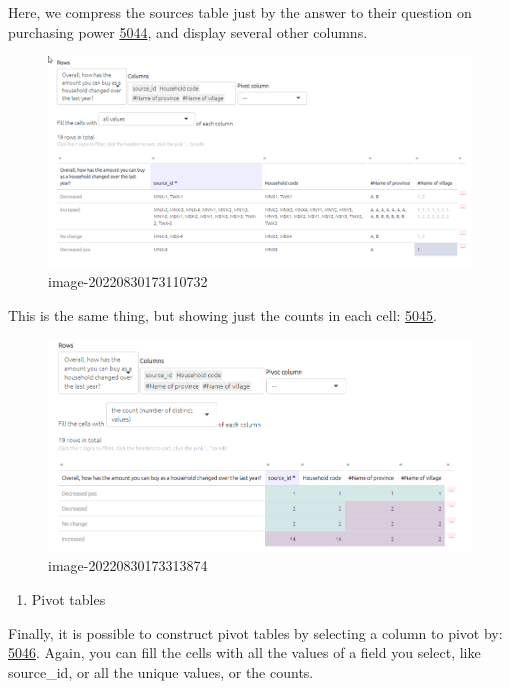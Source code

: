 \documentclass[
]{book}
\providecommand{\tightlist}{%
  \setlength{\itemsep}{0pt}\setlength{\parskip}{0pt}}
\begin{document}
Here, we compress the sources table just by the answer to their question on purchasing power \href{https://causalmap.shinyapps.io/tokyo/?s=5044}{5044}, and display several other columns.

\begin{figure}
\centering
\includegraphics{_assets/image-20220830173110732.png}
\caption{image-20220830173110732}
\end{figure}

This is the same thing, but showing just the counts in each cell: \href{https://causalmap.shinyapps.io/tokyo/?s=5045}{5045}.

\begin{figure}
\centering
\includegraphics{_assets/image-20220830173313874.png}
\caption{image-20220830173313874}
\end{figure}

\begin{enumerate}
\def\labelenumi{\arabic{enumi}.}
\setcounter{enumi}{2}
\tightlist
\item
  Pivot tables
\end{enumerate}

Finally, it is possible to construct pivot tables by selecting a column to pivot by: \href{https://causalmap.shinyapps.io/tokyo/?s=5046}{5046}. Again, you can fill the cells with all the values of a field you select, like source\_id, or all the unique values, or the counts.
\end{document}
